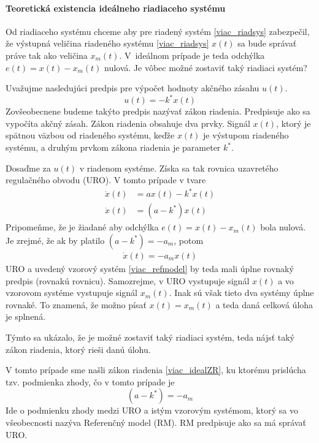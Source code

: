 \documentclass[a4paper, 10pt, ]{article}
\begin{document}
\paragraph{Teoretická existencia ideálneho riadiaceho systému}

Od riadiaceho systému chceme aby pre riadený systém \eqref{viac_riadsys} zabezpečil, že výstupná veličina riadeného systému \eqref{viac_riadsys} $x(t)$ sa bude správať práve tak ako veličina $x_m(t)$. V~ideálnom prípade je teda odchýlka $e(t) = x(t) - x_m(t)$ nulová. Je vôbec možné zostaviť taký riadiaci systém?

Uvažujme nasledujúci predpis pre výpočet hodnoty akčného zásahu $u(t)$.
\begin{equation} \label{viac_idealZR}
	u(t) = -k^* x(t)
\end{equation}
Zovšeobecnene budeme takýto predpis nazývať zákon riadenia. Predpisuje ako sa vypočíta akčný zásah. Zákon riadenia obsahuje dva prvky. Signál $x(t)$, ktorý je spätnou väzbou od riadeného systému, keďže $x(t)$ je výstupom riadeného systému, a druhým prvkom zákona riadenia je parameter $k^*$.


Dosaďme za $u(t)$ v riadenom systéme. Získa sa tak rovnica uzavretého regulačného obvodu (URO). V tomto prípade v tvare
\begin{subequations}
	\begin{align}
		\dot x(t) &= a x(t) - k^* x(t) \\
		\dot x(t) &= \left( a - k^* \right) x(t)
	\end{align}
\end{subequations}
Pripomeňme, že je žiadané aby odchýlka $e(t) = x(t) - x_m(t)$ bola nulová. Je zrejmé, že ak by platilo $\left( a - k^* \right) = -a_m$, potom
\begin{align}
	\dot x(t) = -a_m x(t)
\end{align}
URO a uvedený vzorový systém \eqref{viac_refmodel} by teda mali úplne rovnaký predpis (rovnakú rovnicu). Samozrejme, v URO vystupuje signál $x(t)$ a vo vzorovom systéme vystupuje signál $x_m(t)$. Inak sú však tieto dva systémy úplne rovnaké. To znamená, že možno písať $x(t) = x_m(t)$ a teda daná celková úloha je splnená.

Týmto sa ukázalo, že je možné zostaviť taký riadiaci systém, teda nájsť taký zákon riadenia, ktorý rieši danú úlohu.

V tomto prípade sme našli zákon riadenia \eqref{viac_idealZR}, ku ktorému prislúcha tzv. podmienka zhody, čo v tomto prípade je
\begin{equation}
	\left( a - k^* \right) = -a_m
\end{equation}
Ide o podmienku zhody medzi URO a istým vzorovým systémom, ktorý sa vo všeobecnosti nazýva Referenčný model (RM). RM predpisuje ako sa má správať URO.
\end{document}
